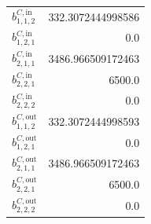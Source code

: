 \documentclass{article}%
\begin{document}
\begin{multicols*}{3}
\begin{supertabular}{lr}
	$b_{1,1,2}^{C,\text{in}}$ & 332.3072444998586 \\%
	$b_{1,2,1}^{C,\text{in}}$ & 0.0 \\%
	$b_{2,1,1}^{C,\text{in}}$ & 3486.966509172463 \\%
	$b_{2,2,1}^{C,\text{in}}$ & 6500.0 \\%
	$b_{2,2,2}^{C,\text{in}}$ & 0.0 \\%
	$b_{1,1,2}^{C,\text{out}}$ & 332.3072444998593 \\%
	$b_{1,2,1}^{C,\text{out}}$ & 0.0 \\%
	$b_{2,1,1}^{C,\text{out}}$ & 3486.966509172463 \\%
	$b_{2,2,1}^{C,\text{out}}$ & 6500.0 \\%
	$b_{2,2,2}^{C,\text{out}}$ & 0.0 \\%
\end{supertabular}%
\end{multicols*}%
\end{document}
